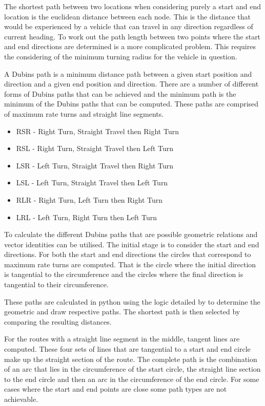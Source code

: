 \documentclass[a4paper,12pt,twoside]{article}
\begin{document}
The shortest path between two locations when considering purely a start and end location is the euclidean distance between each node. This is the distance that would be experienced by a vehicle that can travel in any direction regardless of current heading. To work out the path length between two points where the start and end directions are determined is a more complicated problem. This requires the considering of the minimum turning radius for the vehicle in question.

A Dubins path is a minimum distance path between a given start position and direction and a given end position and direction. There are a number of different forms of Dubins paths that can be achieved and the minimum path is the minimum of the Dubins paths that can be computed. These paths are comprised of maximum rate turns and straight line segments.

\begin{itemize}
\setlength{\itemsep}{-12pt}
\item RSR - Right Turn, Straight Travel then Right Turn
\item RSL - Right Turn, Straight Travel then Left Turn
\item LSR - Left Turn, Straight Travel then Right Turn
\item LSL - Left Turn, Straight Travel then Left Turn
\item RLR - Right Turn, Left Turn then Right Turn
\item LRL - Left Turn, Right Turn then Left Turn

\end{itemize}

To calculate the different Dubins paths that are possible geometric relations and vector identities can be utilised. The initial stage is to consider the start and end directions. For both the start and end directions the circles that correspond to maximum rate turns are computed. That is the circle where the initial direction is tangential to the circumference and the circles where the final direction is tangential to their circumference.

These paths are calculated in python using the logic detailed by  to determine the geometric and draw respective paths. The shortest path is then selected by comparing the resulting distances.

For the routes with a straight line segment in the middle, tangent lines are computed. These four sets of lines that are tangential to a start and end circle make up the straight section of the route. The complete path is the combination of an arc that lies in the circumference of the start circle, the straight line section to the end circle and then an arc in the circumference of the end circle. For some cases where the start and end points are close some path types are not achievable.
\end{document}
